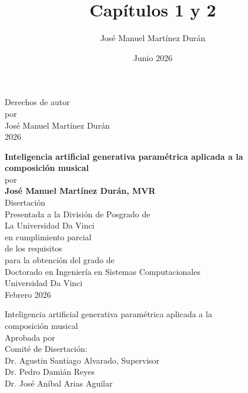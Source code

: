 \documentclass[12pt]{report}
\title{Capítulos 1 y 2}
\author{José Manuel Martínez Durán}
\date{Junio 2026}
\begin{document}
\newpage
\thispagestyle{empty}
\vspace*{\fill}
\begin{center}
\doublespacing
Derechos de autor \\
por \\
José Manuel Martínez Durán \\
2026
\end{center}
\vspace*{\fill}
\newpage

\thispagestyle{empty}
\mbox{}
\newpage

\thispagestyle{empty}
\begin{center}
\doublespacing
\textbf{Inteligencia artificial generativa paramétrica aplicada a la \\ composición musical} \\
\vspace{1em}
por \\
\vspace{1em}
\textbf{José Manuel Martínez Durán, MVR} \\
\vspace{2em}
Disertación \\
Presentada a la División de Posgrado de \\
La Universidad Da Vinci \\
en cumplimiento parcial \\
de los requisitos \\
para la obtención del grado de \\
Doctorado en Ingeniería en Sistemas Computacionales \\
\vspace{2em}
Universidad Da Vinci \\
Febrero 2026
\end{center}
\vspace*{\fill}
\newpage

\thispagestyle{empty}
\begin{center}
\doublespacing
Inteligencia artificial generativa paramétrica aplicada a la \\ composición musical \\
\vspace{2em}
Aprobada por \\
Comité de Disertación: \\
\vspace{1em}
Dr. Agustin Santiago Alvarado, Supervisor \\
Dr. Pedro Damián Reyes \\
Dr. José Aníbal Arias Aguilar
\end{center}
\newpage
\end{document}
